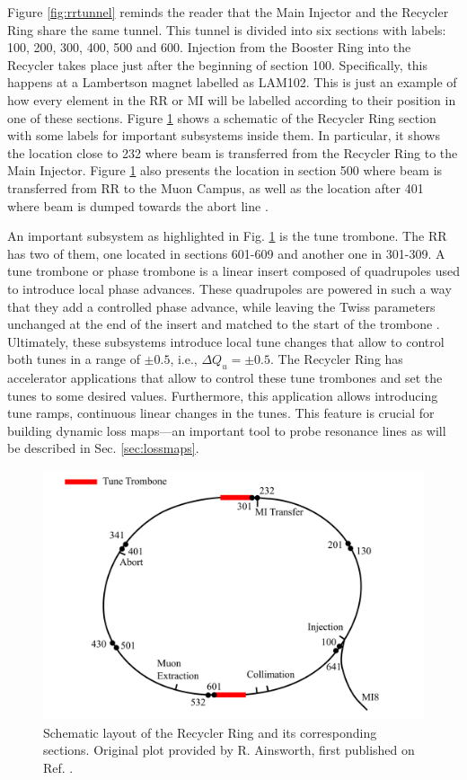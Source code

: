 Figure \ref{fig:rrtunnel} reminds the reader that the Main Injector and the Recycler Ring share the same tunnel. This tunnel is divided into six sections with labels: 100, 200, 300, 400, 500 and 600. Injection from the Booster Ring into the Recycler takes place just after the beginning of section 100. Specifically, this happens at a Lambertson magnet labelled as LAM102. This is just an example of how every element in the RR or MI will be labelled according to their position in one of these sections. Figure \ref{fig:rrschematic} shows a schematic of the Recycler Ring section with some labels for important subsystems inside them. In particular, it shows the location close to 232 where beam is transferred from the Recycler Ring to the Main Injector. Figure \ref{fig:rrschematic} also presents the location in section 500 where beam is transferred from RR to the Muon Campus, as well as the location after 401 where beam is dumped towards the abort line \cite{rr1,fermi_rookie}.

An important subsystem as highlighted in Fig. \ref{fig:rrschematic} is the tune trombone. The RR has two of them, one located in sections 601-609 and another one in 301-309. A tune trombone or phase trombone is a linear insert composed of quadrupoles used to introduce local phase advances. These quadrupoles are powered in such a way that they add a controlled phase advance, while leaving the Twiss parameters unchanged at the end of the insert and matched to the start of the trombone \cite{trombone,rr0}. Ultimately, these subsystems introduce local tune changes that allow to control both tunes in a range of $\pm 0.5$, i.e., $\Delta Q_u = \pm 0.5$. The Recycler Ring has accelerator applications that allow to control these tune trombones and set the tunes to some desired values. Furthermore, this application allows introducing tune ramps, continuous linear changes in the tunes. This feature is crucial for building dynamic loss maps---an important tool to probe resonance lines as will be described in Sec. \ref{sec:lossmaps}.    

\begin{figure}[H]
   \centering
   \includegraphics[width=\columnwidth]{chapter3/RRschematic.png}
   \caption{Schematic layout of the Recycler Ring and its corresponding sections. Original plot provided by R. Ainsworth, first published on Ref. \cite{rr1}.}
   \label{fig:rrschematic}
\end{figure}

